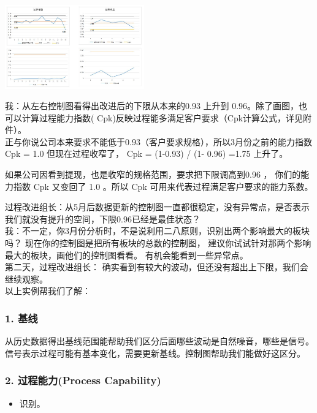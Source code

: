 
\includegraphics[width=6cm]{控制图0.jpg}

我：从左右控制图看得出改进后的下限从本来的0.93 上升到
0.96。除了画图，也可以计算过程能力指数(
Cpk)反映过程能多满足客户要求（Cpk计算公式，详见附件）。\\
正与你说公司本来要求不能低于0.93（客户要求规格），所以3月份之前的能力指数Cpk
= 1.0 但现在过程收窄了， Cpk = (1-0.93) / (1- 0.96) =1.75 上升了。

如果公司因看到提现，也是收窄的规格范围，要求把下限调高到0.96 ，
你们的能力指数 Cpk 又变回了 1.0 。所以 Cpk
可用来代表过程满足客户要求的能力系数。

过程改进组长：从5月后数据更新的控制图一直都很稳定，没有异常点，是否表示我们就没有提升的空间，下限0.96已经是最佳状态？\\
我：不一定，你3月份分析时，不是说利用二八原则，识别出两个影响最大的板块吗？
现在你的控制图是把所有板块的总数的控制图，
建议你试试针对那两个影响最大的板块，画他们的控制图看看。
有机会能看到一些异常点。\\
第二天，过程改进组长：
确实看到有较大的波动，但还没有超出上下限，我们会继续观察。\\
以上实例帮我们了解：

\hypertarget{ux57faux7ebf}{%
\subsubsection{1. 基线}\label{ux57faux7ebf}}

从历史数据得出基线范围能帮助我们区分后面哪些波动是自然噪音，哪些是信号。
信号表示过程可能有基本变化，需要更新基线。控制图帮助我们能做好这区分。

\hypertarget{ux8fc7ux7a0bux80fdux529bprocess-capability}{%
\subsubsection{2. 过程能力(Process
Capability)}\label{ux8fc7ux7a0bux80fdux529bprocess-capability}}

\begin{itemize}
\tightlist
\item
  识别。
\end{itemize}

